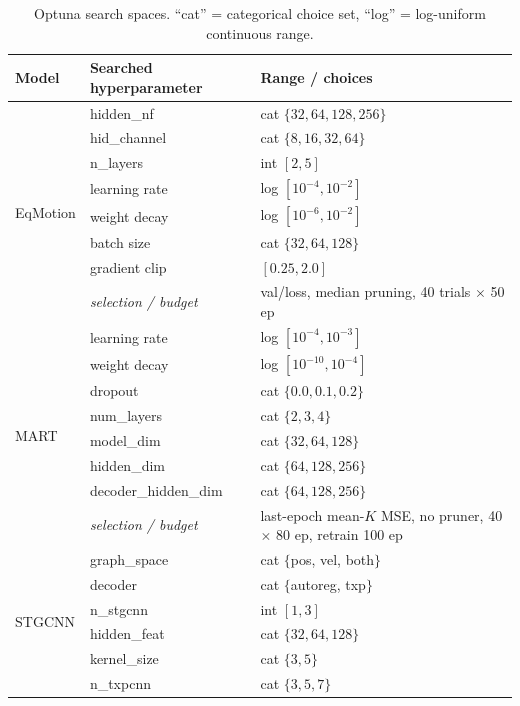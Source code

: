 \documentclass{article} %
\begin{document}
\begin{table}[h]
\caption{Optuna search spaces. ``cat'' = categorical choice set, ``log'' =
log-uniform continuous range.}
\label{tab:hp}
\begin{center}
\small
\begin{tabular}{lll}
\toprule
\textbf{Model} & \textbf{Searched hyperparameter} & \textbf{Range / choices} \\
\midrule
\multirow{8}{*}{EqMotion}
 & hidden\_nf            & cat $\{32, 64, 128, 256\}$ \\
 & hid\_channel         & cat $\{8, 16, 32, 64\}$ \\
 & n\_layers            & int $[2, 5]$ \\
 & learning rate        & log $[10^{-4}, 10^{-2}]$ \\
 & weight decay         & log $[10^{-6}, 10^{-2}]$ \\
 & batch size           & cat $\{32, 64, 128\}$ \\
 & gradient clip        & $[0.25, 2.0]$ \\
\cmidrule(l){2-3}
 & \emph{selection / budget} & val/loss, median pruning, 40 trials $\times$ 50 ep \\
\midrule
\multirow{8}{*}{MART}
 & learning rate        & log $[10^{-4}, 10^{-3}]$ \\
 & weight decay         & log $[10^{-10}, 10^{-4}]$ \\
 & dropout              & cat $\{0.0, 0.1, 0.2\}$ \\
 & num\_layers          & cat $\{2, 3, 4\}$ \\
 & model\_dim           & cat $\{32, 64, 128\}$ \\
 & hidden\_dim          & cat $\{64, 128, 256\}$ \\
 & decoder\_hidden\_dim & cat $\{64, 128, 256\}$ \\
\cmidrule(l){2-3}
 & \emph{selection / budget} & last-epoch mean-$K$ MSE, no pruner, 40 $\times$ 80 ep, retrain 100 ep \\
\midrule
\multirow{11}{*}{STGCNN}
 & graph\_space         & cat $\{$pos, vel, both$\}$ \\
 & decoder              & cat $\{$autoreg, txp$\}$ \\
 & n\_stgcnn            & int $[1, 3]$ \\
 & hidden\_feat         & cat $\{32, 64, 128\}$ \\
 & kernel\_size         & cat $\{3, 5\}$ \\
 & n\_txpcnn            & cat $\{3, 5, 7\}$ \\

\end{tabular}
\end{center}
\end{table}
\end{document}
